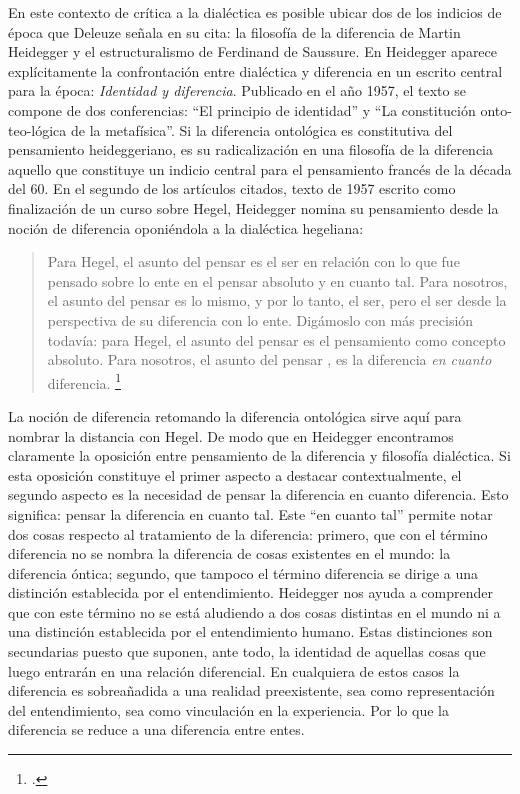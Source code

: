 En este contexto de crítica a la dialéctica es posible ubicar dos de los indicios de época que Deleuze señala en su cita: la filosofía de la diferencia de Martin Heidegger y el estructuralismo de Ferdinand de Saussure. En Heidegger aparece explícitamente la confrontación entre dialéctica y diferencia en un escrito central para la época: \emph{Identidad y diferencia}. Publicado en el año 1957, el texto se compone de dos conferencias: \enquote{El principio de identidad} y \enquote{La constitución onto-teo-lógica de la metafísica}. Si la diferencia ontológica es constitutiva del pensamiento heideggeriano, es su radicalización en una filosofía de la diferencia aquello que constituye un indicio central para el pensamiento francés de la década del 60. En el segundo de los artículos citados, texto de 1957 escrito como finalización de un curso sobre Hegel, Heidegger nomina su pensamiento desde la noción de diferencia oponiéndola a la dialéctica hegeliana:

\begin{quote}
Para Hegel, el asunto del pensar es el ser en relación con lo que fue pensado sobre lo ente en el pensar absoluto y en cuanto tal. Para nosotros, el asunto del pensar es lo mismo, y por lo tanto, el ser, pero el ser desde la perspectiva de su diferencia con lo ente. Digámoslo con más precisión todavía: para Hegel, el asunto del pensar es el pensamiento como concepto absoluto. Para nosotros, el asunto del pensar , es la diferencia \emph{en cuanto} diferencia. \footcite[107]{@6965-HEIDEGGER1988}
\end{quote}

La noción de diferencia retomando la diferencia ontológica sirve aquí para nombrar la distancia con Hegel. De modo que en Heidegger encontramos claramente la oposición entre pensamiento de la diferencia y filosofía dialéctica. Si esta oposición constituye el primer aspecto a destacar contextualmente, el segundo aspecto es la necesidad de pensar la diferencia en cuanto diferencia. Esto significa: pensar la diferencia en cuanto tal. Este \enquote{en cuanto tal} permite notar dos cosas respecto al tratamiento de la diferencia: primero, que con el término diferencia no se nombra la diferencia de cosas existentes en el mundo: la diferencia óntica; segundo, que tampoco el término diferencia se dirige a una distinción establecida por el entendimiento. Heidegger nos ayuda a comprender que con este término no se está aludiendo a dos cosas distintas en el mundo ni a una distinción establecida por el entendimiento humano. Estas distinciones son secundarias puesto que suponen, ante todo, la identidad de aquellas cosas que luego entrarán en una relación diferencial. En cualquiera de estos casos la diferencia es sobreañadida a una realidad preexistente, sea como representación del entendimiento, sea como vinculación en la experiencia. Por lo que la diferencia se reduce a una diferencia entre entes.

